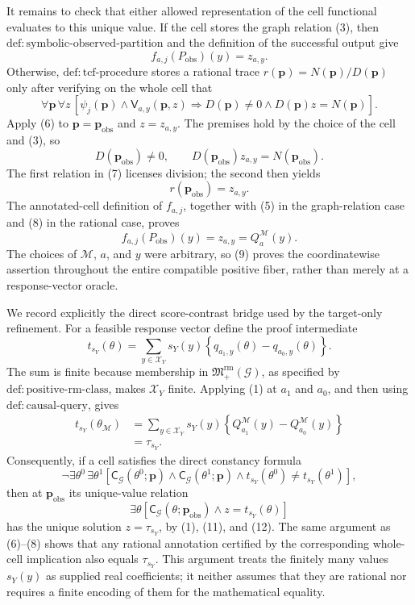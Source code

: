 It remains to check that either allowed representation of the cell functional evaluates to this unique value.  If the cell stores the graph relation (3), then
\(\mathrm{def{:}symbolic\text{-}observed\text{-}partition}\) and the definition of the successful output give
\[
f_{a,j}(P_{\mathrm{obs}})(y)=z_{a,y}.
\tag{5}
\]
Otherwise, \(\mathrm{def{:}tcf\text{-}procedure}\) stores a rational trace
\(r(\mathbf p)=N(\mathbf p)/D(\mathbf p)\) only after verifying on the whole cell that
\[
\forall\mathbf p\,\forall z\,
\left[
\psi_j(\mathbf p)\wedge\mathsf V_{a,y}(\mathbf p,z)
\Longrightarrow
D(\mathbf p)\ne0\wedge D(\mathbf p)z=N(\mathbf p)
\right].
\tag{6}
\]
Apply (6) to \(\mathbf p=\mathbf p_{\mathrm{obs}}\) and \(z=z_{a,y}\).  The premises hold by the choice of the cell and (3), so
\[
D(\mathbf p_{\mathrm{obs}})\ne0,
\qquad
D(\mathbf p_{\mathrm{obs}})z_{a,y}=N(\mathbf p_{\mathrm{obs}}).
\tag{7}
\]
The first relation in (7) licenses division; the second then yields
\[
r(\mathbf p_{\mathrm{obs}})=z_{a,y}.
\tag{8}
\]
The annotated-cell definition of \(f_{a,j}\), together with (5) in the graph-relation case and (8) in the rational case, proves
\[
f_{a,j}(P_{\mathrm{obs}})(y)
=z_{a,y}
=Q_a^{\mathcal M}(y).
\tag{9}
\]
The choices of \(\mathcal M\), \(a\), and \(y\) were arbitrary, so (9) proves the coordinatewise assertion throughout the entire compatible positive fiber, rather than merely at a response-vector oracle.

We record explicitly the direct score-contrast bridge used by the target-only refinement.  For a feasible response vector define the proof intermediate
\[
t_{s_Y}(\theta)
=\sum_{y\in\mathcal X_Y}s_Y(y)
\left\{q_{a_1,y}(\theta)-q_{a_0,y}(\theta)\right\}.
\tag{10}
\]
The sum is finite because membership in \(\mathfrak M_{+}^{\mathrm{rm}}(\mathcal G)\), as specified by \(\mathrm{def{:}positive\text{-}rm\text{-}class}\), makes \(\mathcal X_Y\) finite.  Applying (1) at \(a_1\) and \(a_0\), and then using \(\mathrm{def{:}causal\text{-}query}\), gives
\[
\begin{aligned}
t_{s_Y}(\theta_{\mathcal M})
&=\sum_{y\in\mathcal X_Y}s_Y(y)
\left\{Q_{a_1}^{\mathcal M}(y)-Q_{a_0}^{\mathcal M}(y)\right\}\\
&=\tau_{s_Y}.
\end{aligned}
\tag{11}
\]
Consequently, if a cell satisfies the direct constancy formula
\[
\neg\exists\theta^0\,\exists\theta^1
\left[
\mathsf C_{\mathcal G}(\theta^0;\mathbf p)
\wedge
\mathsf C_{\mathcal G}(\theta^1;\mathbf p)
\wedge
t_{s_Y}(\theta^0)\ne t_{s_Y}(\theta^1)
\right],
\tag{12}
\]
then at \(\mathbf p_{\mathrm{obs}}\) its unique-value relation
\[
\exists\theta\left[
\mathsf C_{\mathcal G}(\theta;\mathbf p_{\mathrm{obs}})
\wedge z=t_{s_Y}(\theta)
\right]
\tag{13}
\]
has the unique solution \(z=\tau_{s_Y}\), by (1), (11), and (12).  The same argument as (6)--(8) shows that any rational annotation certified by the corresponding whole-cell implication also equals \(\tau_{s_Y}\).  This argument treats the finitely many values \(s_Y(y)\) as supplied real coefficients; it neither assumes that they are rational nor requires a finite encoding of them for the mathematical equality.

